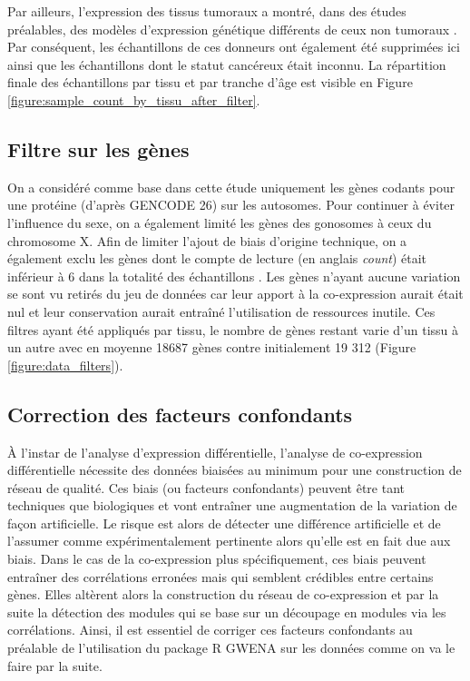 Par ailleurs, l'expression des tissus tumoraux a montré, dans des études préalables, des modèles d'expression génétique différents de ceux non tumoraux . Par conséquent, les échantillons de ces donneurs ont également été supprimées ici ainsi que les échantillons dont le statut cancéreux était inconnu. La répartition finale des échantillons par tissu et par tranche d'âge est visible en Figure \ref{figure:sample_count_by_tissu_after_filter}.


\subsection{Filtre sur les gènes}

On a considéré comme base dans cette étude uniquement les gènes codants pour une protéine (d'après GENCODE 26) sur les autosomes. Pour continuer à éviter l'influence du sexe, on a également limité les gènes des gonosomes à ceux du chromosome X. Afin de limiter l'ajout de biais d'origine technique, on a également exclu les gènes dont le compte de lecture (en anglais \textit{count}) était inférieur à 6 dans la totalité des échantillons . Les gènes n'ayant aucune variation se sont vu retirés du jeu de données car leur apport à la co-expression aurait était nul et leur conservation aurait entraîné l'utilisation de ressources inutile. Ces filtres ayant été appliqués par tissu, le nombre de gènes restant varie d'un tissu à un autre avec en moyenne 18687 gènes contre initialement 19 312 (Figure \ref{figure:data_filters}).



\subsection{Correction des facteurs confondants}

À l'instar de l'analyse d'expression différentielle, l'analyse de co-expression différentielle nécessite des données biaisées au minimum pour une construction de réseau de qualité. Ces biais (ou facteurs confondants) peuvent être tant techniques que biologiques et vont entraîner une augmentation de la variation de façon artificielle. Le risque est alors de détecter une différence artificielle et de l'assumer comme expérimentalement pertinente alors qu'elle est en fait due aux biais. Dans le cas de la co-expression plus spécifiquement, ces biais peuvent entraîner des corrélations erronées mais qui semblent crédibles entre certains gènes. Elles altèrent alors la construction du réseau de co-expression et par la suite la détection des modules qui se base sur un découpage en modules via les corrélations. Ainsi, il est essentiel de corriger ces facteurs confondants au préalable de l'utilisation du package R GWENA  sur les données comme on va le faire par la suite.

